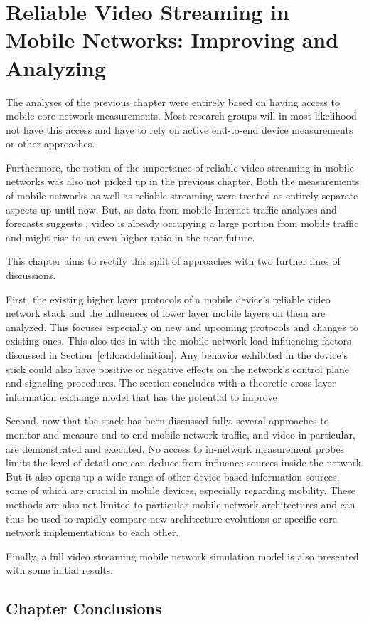 \chapter{Reliable Video Streaming in Mobile Networks: Improving and Analyzing}
\label{chap:mobilestreaming}

The analyses of the previous chapter were entirely based on having access to mobile core network measurements. Most research groups will in most likelihood not have this access and have to rely on active end-to-end device measurements or other approaches.

Furthermore, the notion of the importance of reliable video streaming in mobile networks was also not picked up in the previous chapter. Both the measurements of mobile networks as well as reliable streaming were treated as entirely separate aspects up until now. But, as data from mobile Internet traffic analyses and forecasts suggests \cite{cisco2014VNI}, video is already occupying a large portion from mobile traffic and might rise to an even higher ratio in the near future.

This chapter aims to rectify this split of approaches with two further lines of discussions. 

First, the existing higher layer protocols of a mobile device's reliable video network stack and the influences of lower layer mobile layers on them are analyzed. This focuses especially on new and upcoming protocols and changes to existing ones. This also ties in with the mobile network load influencing factors discussed in Section~\ref{c4:loaddefinition}. Any behavior exhibited in the device's stick could also have positive or negative effects on the network's control plane and signaling procedures. The section concludes with a theoretic cross-layer information exchange model that has the potential to improve 

Second, now that the stack has been discussed fully, several approaches to monitor and measure end-to-end mobile network traffic, and video in particular, are demonstrated and executed. No access to in-network measurement probes limits the level of detail one can deduce from influence sources inside the network. But it also opens up a wide range of other device-based information sources, some of which are crucial in mobile devices, especially regarding mobility. These methods are also not limited to particular mobile network architectures and can thus be used to rapidly compare new architecture evolutions or specific core network implementations to each other. 

Finally, a full video streaming mobile network simulation model is also presented with some initial results.







\section{Chapter Conclusions}



